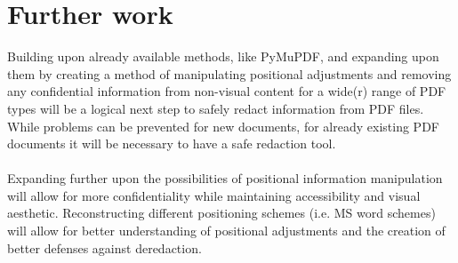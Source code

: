 \section{Further work}
Building upon already available methods, like PyMuPDF, and expanding upon them by creating a method of  manipulating positional adjustments and removing any confidential information from non-visual content for a wide(r) range of PDF types will be a logical next step to safely redact information from PDF files. While problems can be prevented for new documents, for already existing PDF documents it will be necessary to have a safe redaction tool.
\\\\
Expanding further upon the possibilities of positional information manipulation will allow for more confidentiality while maintaining accessibility and visual aesthetic. Reconstructing different positioning schemes (i.e. MS word schemes) will allow for better understanding of positional adjustments and the creation of better defenses against deredaction. 
